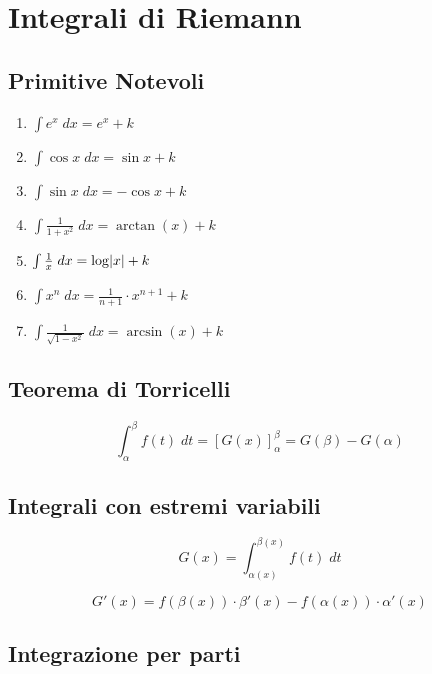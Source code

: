 \documentclass{article}
\begin{document}
\section{Integrali di Riemann}

\subsection{Primitive Notevoli}

\begin{multicols}{2}
    \begin{enumerate}
        \item $\int e^x \; dx = e^x + k$
        \item $\int \cos x \; dx = \sin x + k$
        \item $\int \sin x \; dx = -\cos x + k$
        \item $\int \frac{1}{1 + x^2} \; dx = \arctan(x) + k$
        \item $\int \frac{1}{x} \; dx = \log \abs{x} + k$
        \item $\int x^n \; dx = \frac{1}{n + 1} \cdot x^{n + 1} + k$
        \item $\int \frac{1}{\sqrt{1 - x^2}} \; dx = \arcsin(x) + k$
    \end{enumerate}
\end{multicols}

\subsection{Teorema di Torricelli}

\begin{equation*}
    \int_{\alpha}^\beta f(t) \; dt = [G(x)]_{\alpha}^\beta = G(\beta) - G(\alpha)
\end{equation*}

\subsection{Integrali con estremi variabili}

\begin{equation*}
    G(x) = \int_{\alpha(x)}^{\beta(x)} f(t) \; dt
\end{equation*}

\begin{equation*}
    G'(x) = f(\beta(x)) \cdot \beta'(x) - f(\alpha(x)) \cdot \alpha'(x)
\end{equation*}

\subsection{Integrazione per parti}
\end{document}
